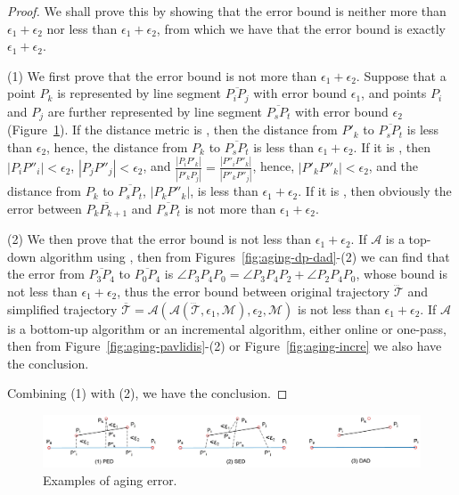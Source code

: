 \begin{proof} 	We shall prove this by showing that the error bound is neither more than $\epsilon_1+ \epsilon_2$  nor less than $\epsilon_1+ \epsilon_2$,
from which we have that the error bound is exactly $\epsilon_1+ \epsilon_2$.

	(1) We first prove that the error bound is not more than $\epsilon_1+ \epsilon_2$. Suppose that a point $P_k$ is represented by line segment $\overline{P_iP_j}$ with error bound $\epsilon_1$, and points $P_i$ and $P_j$ are further represented by line segment $\overline{P_sP_t}$ with error bound $\epsilon_2$ (Figure~\ref{fig:aging-error}).
	If the distance metric is \ped, then the distance from $P'_k$ to $\overline{P_sP_t}$ is less than $\epsilon_2$, hence, the distance from $P_k$ to $\overline{P_sP_t}$ is less than $\epsilon_1 + \epsilon_2$.
	If it is \sed, then $|P_iP''_i|<\epsilon_2$, $|P_jP''_j|<\epsilon_2$, and $\frac{|P_iP'_k|}{|P'_kP_j|} = \frac{|P''_iP''_k|}{|P''_kP''_j|}$, hence, $|P'_kP''_k|<\epsilon_2$, and the distance from $P_k$ to $\overline{P_sP_t}$, \ie $|P_kP''_k|$, is less than $\epsilon_1 + \epsilon_2$.
	If it is \dad, then obviously the error between $\overline{P_kP_{k+1}}$ and $\overline{P_sP_t}$ is not more than $\epsilon_1+ \epsilon_2$.
	
	(2) We then prove that the  error bound is not less than $\epsilon_1+ \epsilon_2$.
	If $\mathcal{A}$ is a top-down algorithm using \dad, then from Figures~\ref{fig:aging-dp-dad}-(2) we can find that the error from $\overline{P_3P_4}$ to $\overline{P_0P_4}$ is $\angle{P_3P_4P_0} = \angle{P_3P_4P_2} + \angle{P_2P_4P_0}$, whose bound is not less than $\epsilon_1 + \epsilon_2$, thus the error bound between original trajectory $\dddot{\mathcal{T}}$ and simplified trajectory $\overline{\mathcal{T}}=\mathcal{A}(\mathcal{A}(\dddot{\mathcal{T}}, \epsilon_1, \mathcal{M}), \epsilon_2, \mathcal{M})$ is not less than $\epsilon_1+ \epsilon_2$.
	If $\mathcal{A}$ is a bottom-up algorithm or an incremental algorithm, either online or one-pass, then from Figure~\ref{fig:aging-pavlidis}-(2) or Figure~\ref{fig:aging-incre} we also have the conclusion.
	
	
	Combining (1) with (2), we have the conclusion.
\end{proof}

\begin{figure}[tb!]
	\centering
	\includegraphics[scale=0.6]{Figures/Fig-aging-error.jpg}
	
	\caption{\small Examples of aging error.}
	\vspace{-2ex}
	\label{fig:aging-error}
\end{figure}
